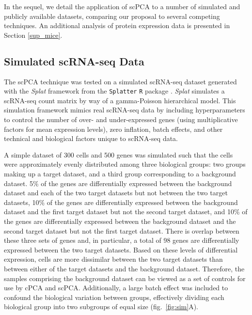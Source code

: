 In the sequel, we detail the application of scPCA to a number of simulated and publicly available datasets, comparing our proposal to several competing techniques. An additional analysis of protein expression data is presented in Section \ref{sup_mice}.

\subsection{Simulated scRNA-seq Data}\label{sim_scRNA-seq}

The scPCA technique was tested on a simulated scRNA-seq dataset generated with the \textit{Splat} framework from the \texttt{Splatter} \texttt{R} package  \cite{Zappia2017}. \textit{Splat} simulates a scRNA-seq count matrix by way of a gamma-Poisson hierarchical model. This simulation framework mimics real scRNA-seq data by including hyperparameters to control the number of over- and under-expressed genes (using multiplicative factors for mean expression levels), zero inflation, batch effects, and other technical and biological factors unique to scRNA-seq data.

A simple dataset of 300 cells and 500 genes was simulated such that the cells were approximately evenly distributed among three biological groups: two groups making up a target dataset, and a third group corresponding to a background dataset. 5\% of the genes are differentially expressed between the background dataset and each of the two target datasets but not between the two target datasets, 10\% of the genes are differentially expressed between the background dataset and the first target dataset but not the second target dataset, and 10\% of the genes are differentially expressed between the background dataset and the second target dataset but not the first target dataset. There is overlap between these three sets of genes and, in particular, a total of 98 genes are differentially expressed between the two target datasets. Based on these levels of differential expression, cells are more dissimilar between the two target datasets than between either of the target datasets and the background dataset. Therefore, the samples comprising the background dataset can be viewed as a set of controls for use by cPCA and scPCA. Additionally, a large batch effect was included to confound the biological variation between groups, effectively dividing each biological group into two subgroups of equal size (fig.~\ref{fig:sim}A).

